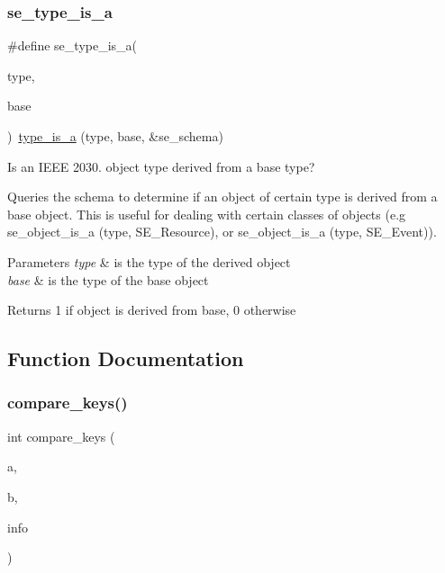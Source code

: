 \subsubsection{\texorpdfstring{se\+\_\+type\+\_\+is\+\_\+a}{se\_type\_is\_a}}
{\footnotesize\ttfamily \#define se\+\_\+type\+\_\+is\+\_\+a(\begin{DoxyParamCaption}\item[{}]{type,  }\item[{}]{base }\end{DoxyParamCaption})~\hyperlink{group__schema_ga16de35ef559b5cc37cf33dd647ceb366}{type\+\_\+is\+\_\+a} (type, base, \&se\+\_\+schema)}



Is an I\+E\+EE 2030. object type derived from a base type? 

Queries the schema to determine if an object of certain type is derived from a base object. This is useful for dealing with certain classes of objects (e.\+g se\+\_\+object\+\_\+is\+\_\+a (type, S\+E\+\_\+\+Resource), or se\+\_\+object\+\_\+is\+\_\+a (type, S\+E\+\_\+\+Event)). 
\begin{DoxyParams}{Parameters}
{\em type} & is the type of the derived object \\
\hline
{\em base} & is the type of the base object \\
\hline
\end{DoxyParams}
\begin{DoxyReturn}{Returns}
1 if object is derived from base, 0 otherwise 
\end{DoxyReturn}


\subsection{Function Documentation}
\mbox{\label{group__se__object_gaa45cdec61c8e3594c5d084c6cea59c19}} 
\subsubsection{\texorpdfstring{compare\+\_\+keys()}{compare\_keys()}}
{\footnotesize\ttfamily int compare\+\_\+keys (\begin{DoxyParamCaption}\item[{void $\ast$}]{a,  }\item[{void $\ast$}]{b,  }\item[{List\+Info $\ast$}]{info }\end{DoxyParamCaption})}



